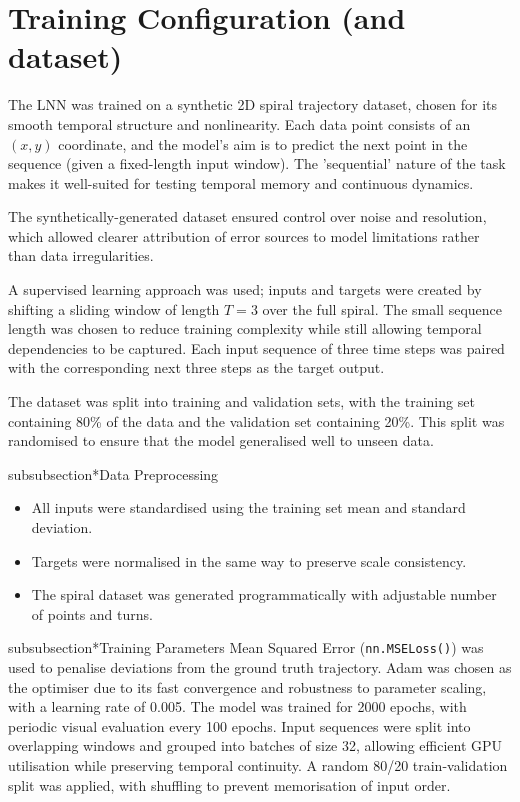 \section{Training Configuration (and dataset)}
The LNN was trained on a synthetic 2D spiral trajectory dataset, chosen for its smooth temporal structure and nonlinearity. Each data point consists of an $(x, y)$ coordinate, and the model's aim is to predict the next point in the sequence (given a fixed-length input window). The 'sequential' nature of the task makes it well-suited for testing temporal memory and continuous dynamics.

The synthetically-generated dataset ensured control over noise and resolution, which allowed clearer attribution of error sources to model limitations rather than data irregularities.

A supervised learning approach was used; inputs and targets were created by shifting a sliding window of length $T = 3$ over the full spiral. The small sequence length was chosen to reduce training complexity while still allowing temporal dependencies to be captured. Each input sequence of three time steps was paired with the corresponding next three steps as the target output.

The dataset was split into training and validation sets, with the training set containing 80\% of the data and the validation set containing 20\%. This split was randomised to ensure that the model generalised well to unseen data.

subsubsection*{Data Preprocessing}
\begin{itemize}
    \item All inputs were standardised using the training set mean and standard deviation.
    \item Targets were normalised in the same way to preserve scale consistency.
    \item The spiral dataset was generated programmatically with adjustable number of points and turns.
\end{itemize}

subsubsection*{Training Parameters}
Mean Squared Error (\texttt{nn.MSELoss()}) was used to penalise deviations from the ground truth trajectory. Adam was chosen as the optimiser due to its fast convergence and robustness to parameter scaling, with a learning rate of 0.005. The model was trained for 2000 epochs, with periodic visual evaluation every 100 epochs. Input sequences were split into overlapping windows and grouped into batches of size 32, allowing efficient GPU utilisation while preserving temporal continuity. A random 80/20 train-validation split was applied, with shuffling to prevent memorisation of input order.

